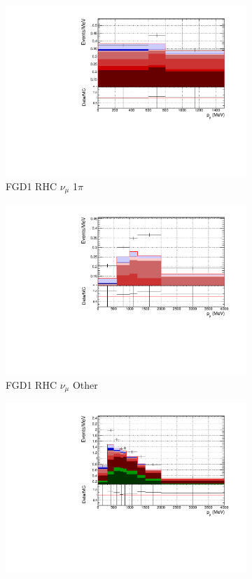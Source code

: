 \begin{figure}
\begin{subfigure}{.32\textwidth}
  \includegraphics[width=0.95\linewidth]{figs/FGD1_NuMuBkg_CC1pi_in_AntiNu_Mode_p}
  \caption{FGD1 RHC $\nu_{\mu}$ 1$\pi$}
  \label{fig:pstack_FGD1_NuMuBkg_CC1pi_in_AntiNu_Mode}
\end{subfigure}
\begin{subfigure}{.32\textwidth}
  \centering
  \includegraphics[width=0.95\linewidth]{figs/FGD1_NuMuBkg_CCOther_in_AntiNu_Mode_p}
  \caption{FGD1 RHC $\nu_{\mu}$ Other}
  \label{fig:pstack_FGD1_NuMuBkg_CCOther_in_AntiNu_Mode}
\end{subfigure}
\begin{subfigure}{.32\textwidth}
  \centering
  \includegraphics[width=0.95\linewidth]{figs/FGD2_NuMuBkg_CC0pi_in_AntiNu_Mode_p}

\end{subfigure}
\end{figure}
